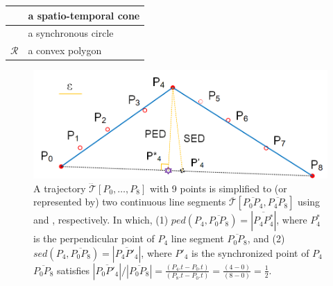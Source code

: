\begin{table}
\begin{tabular}{|c|l|}
		\cone{} & a spatio-temporal cone \\		\hline
		\circle{} & a synchronous circle \\		\hline
		$\mathcal{R}$& a convex polygon \\		\hline
	\end{tabular}
	\label{tab:notations}
	\vspace{-1ex}
\end{table}


\begin{figure}[tb!]
	\centering
	\includegraphics[scale=0.9]{Figures/Fig-Concepts.png}\vspace{-1ex}
	\caption{\small  A trajectory $\dddot{\mathcal{T}}[P_0, \ldots, P_{8}]$ with 9 points is simplified to (or represented by) two continuous line segments $ \overline{\mathcal{T}}[\overline{P_0P_4}, \overline{P_4P_{8}}] $ using \ped and \sed, respectively. In which, (1) $ped(P_4, \overline{P_0P_{8}})=|\overline{P_4P^*_4}|$, where $P^*_4$ is the perpendicular point of $P_4$ \wrt line segment $\overline{P_0P_{8}}$, and (2) $sed(P_4, \overline{P_0P_{8}})= |\overline{P_4P'_4}|$, where $P'_4$ is the synchronized point of $P_4$ \wrt $\overline{P_0P_{8}}$ satisfies ${|\overline{P_0P'_4}|}/{|\overline{P_0P_{8}}|} = \frac{(P_4.t - P_0.t)}{(P_{8}.t-P_0.t)} = \frac{(4-0)}{(8-0)}= \frac{1}{2}$.}
	\vspace{-2ex}
	\label{fig:concepts}
\end{figure}


